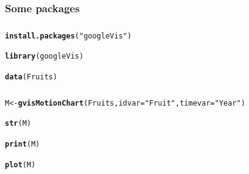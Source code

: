 \documentclass[12pt]{beamer}\usepackage[]{graphicx}\usepackage[]{color}
\makeatletter
\newcommand{\hlstr}[1]{\textcolor[rgb]{0.192,0.494,0.8}{#1}}%
\newcommand{\hlstd}[1]{\textcolor[rgb]{0.345,0.345,0.345}{#1}}%
\newcommand{\hlkwb}[1]{\textcolor[rgb]{0.69,0.353,0.396}{#1}}%
\newcommand{\hlkwc}[1]{\textcolor[rgb]{0.333,0.667,0.333}{#1}}%
\newcommand{\hlkwd}[1]{\textcolor[rgb]{0.737,0.353,0.396}{\textbf{#1}}}%
\newenvironment{kframe}{%
 \def\at@end@of@kframe{}%
 \ifinner\ifhmode%
  \def\at@end@of@kframe{\end{minipage}}%
  \begin{minipage}{\columnwidth}%
 \fi\fi%
 \def\FrameCommand##1{\hskip\@totalleftmargin \hskip-\fboxsep
 \colorbox{shadecolor}{##1}\hskip-\fboxsep
     \hskip-\linewidth \hskip-\@totalleftmargin \hskip\columnwidth}%
 \MakeFramed {\advance\hsize-\width
   \@totalleftmargin\z@ \linewidth\hsize
   \@setminipage}}%
 {\par\unskip\endMakeFramed%
 \at@end@of@kframe}
\newenvironment{knitrout}{}{} %
\makeatother
\begin{document}

\begin{frame}
\begin{center}
\Huge{}
\end{center}
\end{frame}


\begin{frame}
\frametitle{Some packages}

\bi
  \item {}
  \item {}
  \item {}
  \item {}  
\ei

\end{frame}


\begin{frame}[fragile]
\frametitle{}

\begin{knitrout}\footnotesize
{}\color{fgcolor}\begin{kframe}
\begin{alltt}
\hlkwd{install.packages}\hlstd{(}\hlstr{"googleVis"}\hlstd{)}

\hlkwd{library}\hlstd{(googleVis)}

\hlkwd{data}\hlstd{(Fruits)}
\end{alltt}
\end{kframe}
\end{knitrout}

\end{frame}


\begin{frame}[fragile]
\frametitle{}

\begin{knitrout}\footnotesize
{}\color{fgcolor}\begin{kframe}
\begin{alltt}
\hlstd{M} \hlkwb{<-} \hlkwd{gvisMotionChart}\hlstd{(Fruits,} \hlkwc{idvar}\hlstd{=}\hlstr{"Fruit"}\hlstd{,} \hlkwc{timevar}\hlstd{=}\hlstr{"Year"}\hlstd{)}

\hlkwd{str}\hlstd{(M)}

\hlkwd{print}\hlstd{(M)}

\hlkwd{plot}\hlstd{(M)}
\end{alltt}
\end{kframe}
\end{knitrout}

\end{frame}

\end{document}
